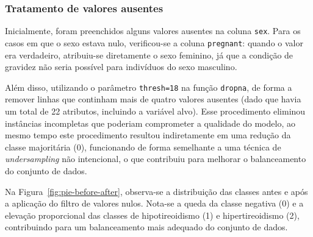 \documentclass[11pt]{article}
\begin{document}
\subsubsection{Tratamento de valores ausentes}

Inicialmente, foram preenchidos alguns valores ausentes na coluna \texttt{sex}. Para os casos em que o sexo estava nulo, verificou-se a coluna \texttt{pregnant}: quando o valor era verdadeiro, atribuiu-se diretamente o sexo feminino, já que a condição de gravidez não seria possível para indivíduos do sexo masculino.

Além disso, utilizando o parâmetro \texttt{thresh=18} na função \texttt{dropna}, de forma a remover linhas que continham mais de quatro valores ausentes (dado que havia um total de 22 atributos, incluindo a variável alvo). Esse procedimento eliminou instâncias incompletas que poderiam comprometer a qualidade do modelo, ao mesmo tempo este procedimento resultou indiretamente em uma redução da classe majoritária (0), funcionando de forma semelhante a uma técnica de \textit{undersampling} não intencional, o que contribuiu para melhorar o balanceamento do conjunto de dados.

Na Figura~\ref{fig:pie-before-after}, observa-se a distribuição das classes antes e após a aplicação do filtro de valores nulos. Nota-se a queda da classe negativa (0) e a elevação proporcional das classes de hipotireoidismo (1) e hipertireoidismo (2), contribuindo para um balanceamento mais adequado do conjunto de dados.
\end{document}
